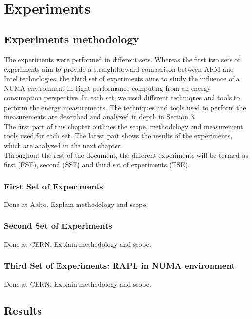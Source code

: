 \chapter{Experiments}

\section{Experiments methodology}

The experiments were performed in different sets. 
Whereas the first two sets of experiments aim to provide a straightforward 
comparison between ARM and Intel technologies, the third set of experiments aims
to study the influence of a NUMA environment in hight performance computing from
an energy consumption perspective.
In each set, we used different
techniques and tools to perform the energy measurements. The techniques and tools
used to perform the measurements are described and analyzed in depth in 
Section 3. \\ 
The first part of this chapter outlines the scope, methodology and measurement
tools used for each set. The latest part shows the results of the 
experiments, which are analyzed in the next chapter. \\
Throughout the rest of the document, the different experiments will be termed as
first (FSE), second (SSE) and third set of experiments (TSE). 

\subsection{First Set of Experiments}
Done at Aalto. Explain methodology and scope.

\subsection{Second Set of Experiments}
Done at CERN. Explain methodology and scope.

\subsection{Third Set of Experiments: RAPL in NUMA environment}
Done at CERN. Explain methodology and scope.

\section{Results}

